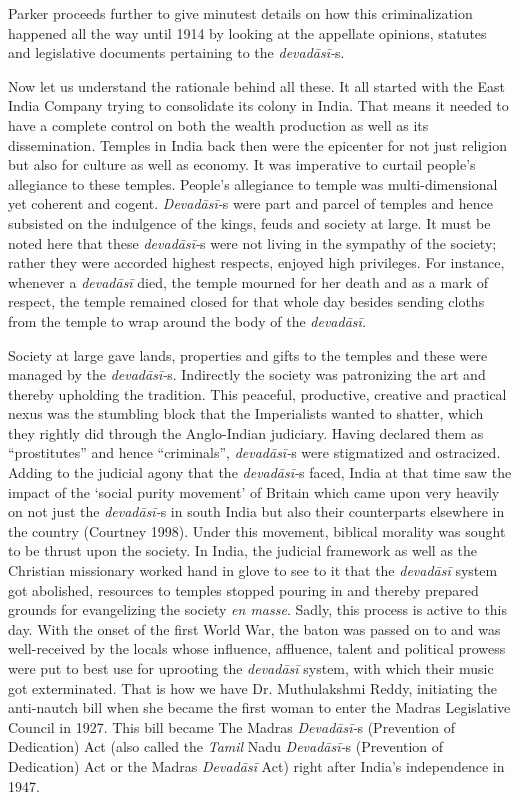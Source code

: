 Parker proceeds further to give minutest details on how this criminalization happened all the way until 1914 by looking at the appellate opinions, statutes and legislative documents pertaining to the \textit{devadāsī-}s.

Now let us understand the rationale behind all these. It all started with the East India Company trying to consolidate its colony in India. That means it needed to have a complete control on both the wealth production as well as its dissemination. Temples in India back then were the epicenter for not just religion but also for culture as well as economy. It was imperative to curtail people’s allegiance to these temples. People’s allegiance to temple was multi-dimensional yet coherent and cogent. \textit{Devadāsī-}s were part and parcel of temples and hence subsisted on the indulgence of the kings, feuds and society at large. It must be noted here that these \textit{devadāsī-}s were not living in the sympathy of the society; rather they were accorded highest respects, enjoyed high privileges. For instance, whenever a \textit{devadāsī }died, the temple mourned for her death and as a mark of respect, the temple remained closed for that whole day besides sending cloths from the temple to wrap around the body of the \textit{devadāsī.}

Society at large gave lands, properties and gifts to the temples and these were managed by the \textit{devadāsī-}s. Indirectly the society was patronizing the art and thereby upholding the tradition. This peaceful, productive, creative and practical nexus was the stumbling block that the Imperialists wanted to shatter, which they rightly did through the Anglo-Indian judiciary. Having declared them as “prostitutes” and hence “criminals”, \textit{devadāsī-}s were stigmatized and ostracized. Adding to the judicial agony that the \textit{devadāsī-}s faced, India at that time saw the impact of the ‘social purity movement’ of Britain which came upon very heavily on not just the \textit{devadāsī-}s in south India but also their counterparts elsewhere in the country (Courtney 1998). Under this movement, biblical morality was sought to be thrust upon the society. In India, the judicial framework as well as the Christian missionary worked hand in glove to see to it that the \textit{devadāsī} system got abolished, resources to temples stopped pouring in and thereby prepared grounds for evangelizing the society \textit{en masse}. Sadly, this process is active to this day. With the onset of the first World War, the baton was passed on to and was well-received by the locals whose influence, affluence, talent and political prowess were put to best use for uprooting the \textit{devadāsī} system, with which their music got exterminated. That is how we have Dr. Muthulakshmi Reddy, initiating the anti-nautch bill when she became the first woman to enter the Madras Legislative Council in 1927. This bill became The Madras \textit{Devadāsī-}s (Prevention of Dedication) Act (also called the \textit{Tamil} Nadu \textit{Devadāsī-}s (Prevention of Dedication) Act or the Madras \textit{Devadāsī} Act) right after India’s independence in 1947.

